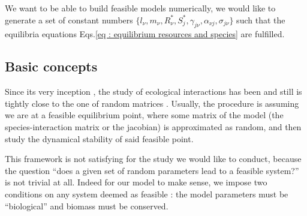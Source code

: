 \documentclass[12pt, titlepage]{report}
\begin{document}
We want to be able to build feasible models numerically, \ie we would like to generate a set of constant numbers $\{
l_\nu, m_\nu, R^*_\nu, S^*_j, \gamma_{j\nu}, \alpha_{\nu j}, \sigma_{j\nu}\}$ such that the equilibria equations Eqs.\eqref{eq : equilibrium resources and species} are fulfilled.


\subsection{Basic concepts}
Since its very inception \cite{may_will_1972}, the study of ecological interactions has been and still is tightly close to the one of random matrices \cite{allesina_stability_2012, allesina_predicting_2015, barbier_cavity_2017}. Usually, the procedure is assuming we are at a feasible equilibrium point, where some matrix of the model (\eg the species-interaction matrix or the jacobian) is approximated as random, and then study the dynamical stability of said feasible point.

This framework is not satisfying for the study we would like to conduct, because the question ``does a given set of random parameters lead to a feasible system?'' is not trivial at all. Indeed for our model to make sense, we impose two conditions on any system deemed as feasible : the model parameters must be ``biological'' and biomass must be conserved.
\end{document}
